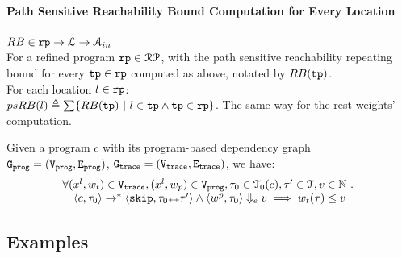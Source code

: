 \paragraph*{Path Sensitive Reachability Bound Computation for Every Location}
$RB \in \mathtt{rp} \to \mathcal{L} \to \mathcal{A}_{in}$
\\
For a refined program $\mathtt{rp} \in \mathcal{RP}$, 
with the path sensitive reachability repeating bound for every $\mathtt{tp} \in \mathtt{rp}$
computed as above, notated by $RB(\mathtt{tp})$.
\\
For each location $l \in \mathtt{rp}$:
\\
$psRB(l) \triangleq \sum\left\{ RB(\tpath) ~ \middle\vert ~ l \in \tpath \land \tpath \in \rprog \right\}$.
%
The same way for the rest weights' computation.

\begin{thm}
  \label{thm:pathsensitiverb_soundness}
Given a program ${c}$ with its program-based dependency graph 
$\mathtt{{G_{prog}}} = (\mathtt{{V_{prog}}}, \mathtt{{E_{prog}}})$,
$\mathtt{{G_{trace}}} = (\mathtt{{V_{trace}}}, \mathtt{{E_{trace}}})$, we have:
%
\[
  \begin{array}{l}
  \forall (x^l, w_{t}) \in \mathtt{{V_{trace}}},
  (x^l, w_{p}) \in \mathtt{{V_{prog}}}, 
  \mathtt{\tau}_0 \in \mathcal{T}_0(c), 
  \mathtt{\tau}' \in \mathcal{T}, v \in \mathbb{N} ~.~
  \\ \quad
  \langle {c}, \mathtt{\tau}_0 \rangle \to^{*} \langle \mathtt{skip}, \mathtt{\tau}_0{\scriptscriptstyle ++}\mathtt{\tau}' \rangle 
  \land 
  \langle w^{p}, \mathtt{\tau}_0 \rangle \Downarrow_e v
  \implies
  w_{t}(\mathtt{\tau}) \leq v
  \end{array}
\]
\end{thm}

\subsection{Examples}



